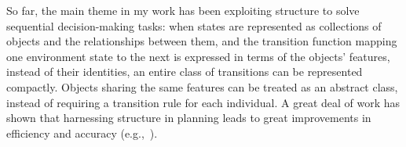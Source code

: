 \documentclass[12pt]{article}
\begin{document}
So far, the main theme in my work has been exploiting structure to solve sequential decision-making tasks: when states are represented as collections of objects and the relationships between them, and the transition function mapping one environment state to the next is expressed in terms of the objects' features, instead of their identities, an entire class of transitions can be represented compactly. Objects sharing the same features can be treated as an abstract class, instead of requiring a transition rule for each individual. A great deal of work has shown that harnessing structure in planning leads to great improvements in efficiency and accuracy (e.g.,~\cite{givan03aij,guestrin03ijcai,kersting04,sanner05uai}). 








\end{document}

